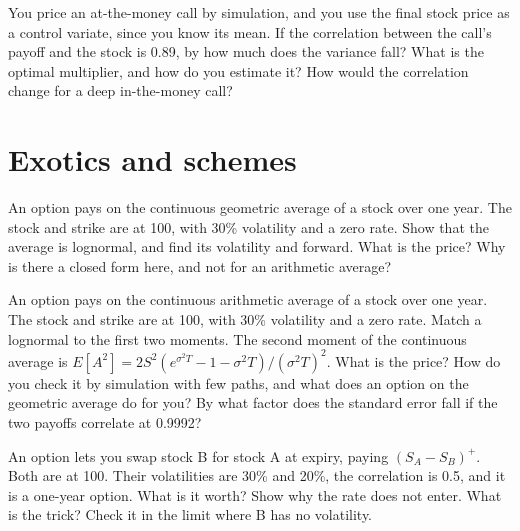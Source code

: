 \begin{question}\label{iq:iv2:pricing-and-numerics:32}
You price an at-the-money call by simulation, and you use the final stock price as a control variate, since you know its mean. If the correlation between the call's payoff and the stock is 0.89, by how much does the variance fall? What is the optimal multiplier, and how do you estimate it? How would the correlation change for a deep in-the-money call?
\end{question}

\section{Exotics and schemes}

\begin{question}\label{iq:iv2:pricing-and-numerics:33}
An option pays on the continuous geometric average of a stock over one year. The stock and strike are at 100, with 30\% volatility and a zero rate. Show that the average is lognormal, and find its volatility and forward. What is the price? Why is there a closed form here, and not for an arithmetic average?
\end{question}

\begin{question}\label{iq:iv2:pricing-and-numerics:34}
An option pays on the continuous arithmetic average of a stock over one year. The stock and strike are at 100, with 30\% volatility and a zero rate. Match a lognormal to the first two moments. The second moment of the continuous average is $E[A^2] = 2S^2(e^{\sigma^2T} - 1 - \sigma^2T)/(\sigma^2T)^2$. What is the price? How do you check it by simulation with few paths, and what does an option on the geometric average do for you? By what factor does the standard error fall if the two payoffs correlate at 0.9992?
\end{question}

\begin{question}\label{iq:iv2:pricing-and-numerics:35}
An option lets you swap stock B for stock A at expiry, paying $(S_A - S_B)^+$. Both are at 100. Their volatilities are 30\% and 20\%, the correlation is 0.5, and it is a one-year option. What is it worth? Show why the rate does not enter. What is the trick? Check it in the limit where B has no volatility.
\end{question}

